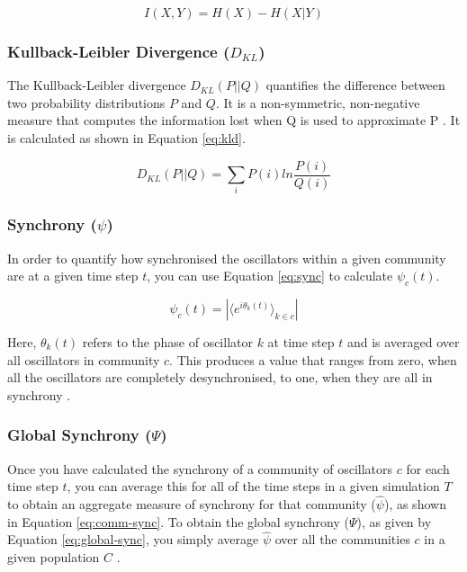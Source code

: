 \documentclass[a4paper,11pt]{article}
\begin{document}
\begin{equation}
\label{eq:mi}
I(X,Y) = H(X) - H(X|Y)
\end{equation}

\subsubsection{Kullback-Leibler Divergence ($D_{KL}$)}
\label{sec:bg:kld}

The Kullback-Leibler divergence $D_{KL}(P || Q)$ quantifies the difference between two probability distributions $P$ and $Q$. It is a non-symmetric, non-negative measure that computes the information lost when Q is used to approximate P \cite{Burnham2002}. It is calculated as shown in Equation \ref{eq:kld}.

\begin{equation}
\label{eq:kld}
D_{KL}(P || Q) = \sum_{i} P(i) ln \frac{P(i)}{Q(i)}
\end{equation}

\subsubsection{Synchrony ($\psi$)}
\label{sec:bg:sync}

In order to quantify how synchronised the oscillators within a given community are at a given time step $t$, you can use Equation \ref{eq:sync} to calculate $\psi_c(t)$\cite{Shanahan2010}. 

\begin{equation} \label{eq:sync}
\psi_c(t) = |\langle e^{i\theta_k(t)}\rangle_{k \in c}|
\end{equation}

Here, $\theta_k(t)$ refers to the phase of oscillator $k$ at time step $t$ and is averaged over all oscillators in community $c$. This produces a value that ranges from zero, when all the oscillators are completely desynchronised, to one, when they are all in synchrony \cite{Shanahan2010}.

\subsubsection{Global Synchrony ($\Psi$)}
\label{sec:bg:global-sync}

Once you have calculated the synchrony of a community of oscillators $c$ for each time step $t$, you can average this for all of the time steps in a given simulation $T$ to obtain an aggregate measure of synchrony for that community ($\widehat{\psi}$), as shown in Equation \ref{eq:comm-sync}.  To obtain the global synchrony ($\Psi$), as given by Equation \ref{eq:global-sync}, you simply average $\widehat{\psi}$ over all the communities $c$ in a given population $C$ \cite{Shanahan2010}.
\end{document}
